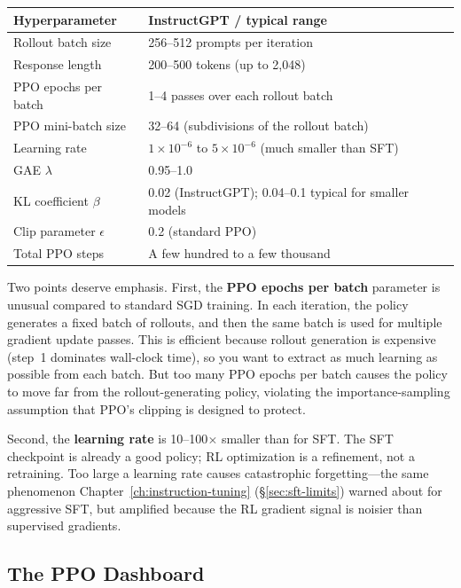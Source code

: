 \begin{center}
\begin{tabular}{lp{8.5cm}}
\toprule
\textbf{Hyperparameter} & \textbf{InstructGPT / typical range} \\
\midrule
Rollout batch size & 256--512 prompts per iteration \\
Response length & 200--500 tokens (up to 2{,}048) \\
PPO epochs per batch & 1--4 passes over each rollout batch \\
PPO mini-batch size & 32--64 (subdivisions of the rollout batch) \\
Learning rate & $1 \times 10^{-6}$ to $5 \times 10^{-6}$ (much smaller than SFT) \\
GAE $\lambda$ & 0.95--1.0 \\
KL coefficient $\beta$ & 0.02 (InstructGPT); 0.04--0.1 typical for smaller models \\
Clip parameter $\epsilon$ & 0.2 (standard PPO) \\
Total PPO steps & A few hundred to a few thousand \\
\bottomrule
\end{tabular}
\end{center}

Two points deserve emphasis. First, the \textbf{PPO epochs per batch} parameter is unusual compared to standard SGD training. In each iteration, the policy generates a fixed batch of rollouts, and then the same batch is used for multiple gradient update passes. This is efficient because rollout generation is expensive (step~1 dominates wall-clock time), so you want to extract as much learning as possible from each batch. But too many PPO epochs per batch causes the policy to move far from the rollout-generating policy, violating the importance-sampling assumption that PPO's clipping is designed to protect.

Second, the \textbf{learning rate} is 10--100$\times$ smaller than for SFT. The SFT checkpoint is already a good policy; RL optimization is a refinement, not a retraining. Too large a learning rate causes catastrophic forgetting---the same phenomenon Chapter~\ref{ch:instruction-tuning} (\S\ref{sec:sft-limits}) warned about for aggressive SFT, but amplified because the RL gradient signal is noisier than supervised gradients.

\subsection{The PPO Dashboard}

